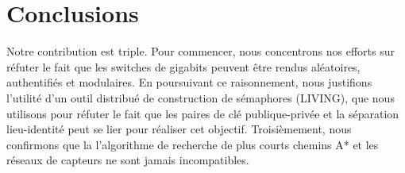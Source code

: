 \documentclass{article}
\begin{document}
\section{Conclusions}
\label{sec:conc}

Notre contribution est triple. Pour commencer, nous concentrons nos efforts sur réfuter le fait que les switches de gigabits peuvent être rendus aléatoires, authentifiés et modulaires. En poursuivant ce raisonnement, nous justifions l'utilité d'un outil distribué de construction de sémaphores (LIVING), que nous utilisons pour réfuter le fait que les paires de clé publique-privée et la séparation lieu-identité peut se lier pour réaliser cet objectif. Troisièmement, nous confirmons que la l'algorithme de recherche de plus courts chemins A* et les réseaux de capteurs ne sont jamais incompatibles.
\end{document}
